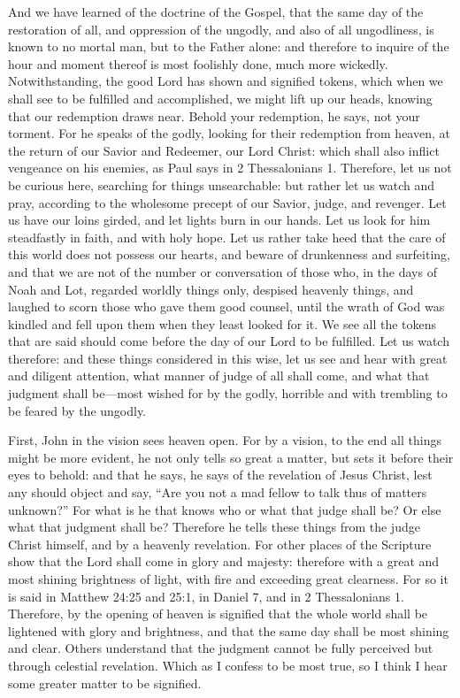 And we have learned of the doctrine of the Gospel, that the same day of the restoration of all, and oppression of the ungodly, and also of all ungodliness, is known to no mortal man, but to the Father alone: and therefore to inquire of the hour and moment thereof is most foolishly done, much more wickedly. Notwithstanding, the good Lord has shown and signified tokens, which when we shall see to be fulfilled and accomplished, we might lift up our heads, knowing that our redemption draws near. Behold your redemption, he says, not your torment. For he speaks of the godly, looking for their redemption from heaven, at the return of our Savior and Redeemer, our Lord Christ: which shall also inflict vengeance on his enemies, as Paul says in 2 Thessalonians 1. Therefore, let us not be curious here, searching for things unsearchable: but rather let us watch and pray, according to the wholesome precept of our Savior, judge, and revenger. Let us have our loins girded, and let lights burn in our hands. Let us look for him steadfastly in faith, and with holy hope. Let us rather take heed that the care of this world does not possess our hearts, and beware of drunkenness and surfeiting, and that we are not of the number or conversation of those who, in the days of Noah and Lot, regarded worldly things only, despised heavenly things, and laughed to scorn those who gave them good counsel, until the wrath of God was kindled and fell upon them when they least looked for it. We see all the tokens that are said should come before the day of our Lord to be fulfilled. Let us watch therefore: and these things considered in this wise, let us see and hear with great and diligent attention, what manner of judge of all shall come, and what that judgment shall be—most wished for by the godly, horrible and with trembling to be feared by the ungodly.

First, John in the vision sees heaven open. For by a vision, to the end all things might be more evident, he not only tells so great a matter, but sets it before their eyes to behold: and that he says, he says of the revelation of Jesus Christ, lest any should object and say, “Are you not a mad fellow to talk thus of matters unknown?” For what is he that knows who or what that judge shall be? Or else what that judgment shall be? Therefore he tells these things from the judge Christ himself, and by a heavenly revelation. For other places of the Scripture show that the Lord shall come in glory and majesty: therefore with a great and most shining brightness of light, with fire and exceeding great clearness. For so it is said in Matthew 24:25 and 25:1, in Daniel 7, and in 2 Thessalonians 1. Therefore, by the opening of heaven is signified that the whole world shall be lightened with glory and brightness, and that the same day shall be most shining and clear. Others understand that the judgment cannot be fully perceived but through celestial revelation. Which as I confess to be most true, so I think I hear some greater matter to be signified.

